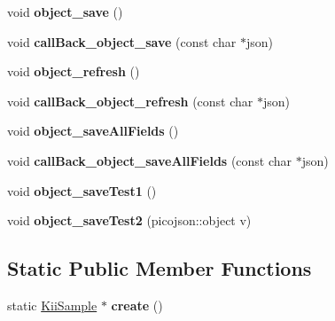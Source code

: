 \begin{DoxyCompactItemize}
\item 
\hypertarget{class_kii_sample_a0041c905752bde258d0c5c5cbb4e8ac5}{void {\bfseries object\-\_\-save} ()}\label{class_kii_sample_a0041c905752bde258d0c5c5cbb4e8ac5}

\item 
\hypertarget{class_kii_sample_a5751be70b63c94543c5d87b5f2ebcf58}{void {\bfseries call\-Back\-\_\-object\-\_\-save} (const char $\ast$json)}\label{class_kii_sample_a5751be70b63c94543c5d87b5f2ebcf58}

\item 
\hypertarget{class_kii_sample_ac108b135bf7121400c2fda7f1979fbea}{void {\bfseries object\-\_\-refresh} ()}\label{class_kii_sample_ac108b135bf7121400c2fda7f1979fbea}

\item 
\hypertarget{class_kii_sample_aac2a86290f228d8c155019cf2f9193fc}{void {\bfseries call\-Back\-\_\-object\-\_\-refresh} (const char $\ast$json)}\label{class_kii_sample_aac2a86290f228d8c155019cf2f9193fc}

\item 
\hypertarget{class_kii_sample_ad84df4f96a8f43b1615407bffcac8979}{void {\bfseries object\-\_\-save\-All\-Fields} ()}\label{class_kii_sample_ad84df4f96a8f43b1615407bffcac8979}

\item 
\hypertarget{class_kii_sample_a5b9e0f3103b2c3fe7cf0b229a768c6c2}{void {\bfseries call\-Back\-\_\-object\-\_\-save\-All\-Fields} (const char $\ast$json)}\label{class_kii_sample_a5b9e0f3103b2c3fe7cf0b229a768c6c2}

\item 
\hypertarget{class_kii_sample_ad1638875bb62a545ef0a7de9d7c1cd6d}{void {\bfseries object\-\_\-save\-Test1} ()}\label{class_kii_sample_ad1638875bb62a545ef0a7de9d7c1cd6d}

\item 
\hypertarget{class_kii_sample_ae4adff774661bc668a6aea55c8ed067c}{void {\bfseries object\-\_\-save\-Test2} (picojson\-::object v)}\label{class_kii_sample_ae4adff774661bc668a6aea55c8ed067c}

\end{DoxyCompactItemize}
\subsection*{Static Public Member Functions}
\begin{DoxyCompactItemize}
\item 
\hypertarget{class_kii_sample_a62076ba1f3d253292dcb01a906d76acc}{static \hyperlink{class_kii_sample}{Kii\-Sample} $\ast$ {\bfseries create} ()}\label{class_kii_sample_a62076ba1f3d253292dcb01a906d76acc}

\end{DoxyCompactItemize}
